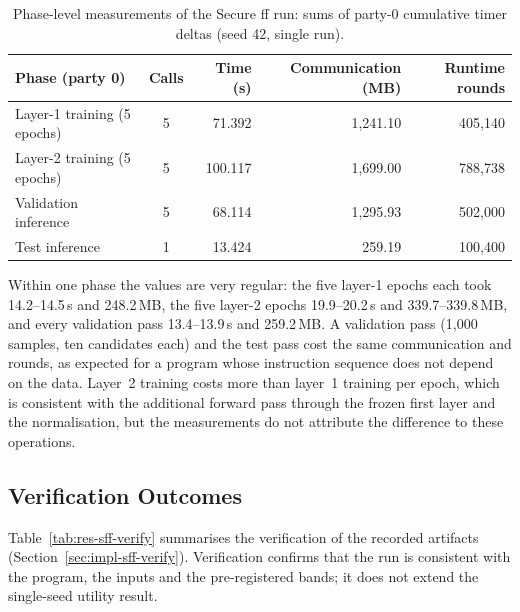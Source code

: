 \begin{table}[htbp]
\centering
\small
\begin{tabular}{@{}lcrrr@{}}
\toprule
Phase (party 0) & Calls & Time (s) & Communication (MB) & Runtime rounds \\
\midrule
Layer-1 training (5 epochs) & 5 & 71.392 & 1{,}241.10 & 405{,}140 \\
Layer-2 training (5 epochs) & 5 & 100.117 & 1{,}699.00 & 788{,}738 \\
Validation inference & 5 & 68.114 & 1{,}295.93 & 502{,}000 \\
Test inference & 1 & 13.424 & 259.19 & 100{,}400 \\
\bottomrule
\end{tabular}
\caption{Phase-level measurements of the Secure \ac{ff} run: sums of party-0 cumulative timer deltas (seed 42, single run).}
\label{tab:res-sff-phase}
\end{table}

Within one phase the values are very regular: the five layer-1 epochs each took 14.2--14.5\,s and 248.2\,MB, the five layer-2 epochs 19.9--20.2\,s and 339.7--339.8\,MB, and every validation pass 13.4--13.9\,s and 259.2\,MB. A validation pass (1{,}000 samples, ten candidates each) and the test pass cost the same communication and rounds, as expected for a program whose instruction sequence does not depend on the data. Layer~2 training costs more than layer~1 training per epoch, which is consistent with the additional forward pass through the frozen first layer and the normalisation, but the measurements do not attribute the difference to these operations.

\FloatBarrier
\subsection{Verification Outcomes}\label{sec:res-sff-verify}
Table~\ref{tab:res-sff-verify} summarises the verification of the recorded artifacts (Section~\ref{sec:impl-sff-verify}). Verification confirms that the run is consistent with the program, the inputs and the pre-registered bands; it does not extend the single-seed utility result.

